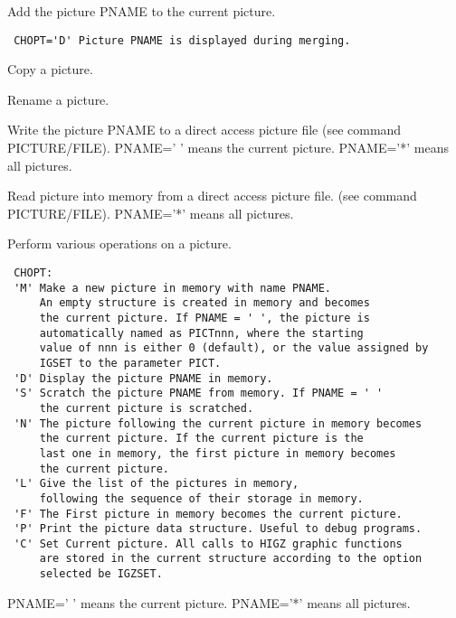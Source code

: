 \BEGARG
{}
\ENDARG
\BEGTEXT
Add the picture PNAME to the current picture.
\begin{verbatim}
 CHOPT='D' Picture PNAME is displayed during merging.
\end{verbatim}
\ENDTEXT

\BEGARG
{}
\ENDARG
\BEGTEXT
Copy a picture.
\ENDTEXT

\BEGARG
{}
\ENDARG
\BEGTEXT
Rename a picture.
\ENDTEXT

\BEGARG
{}
\ENDARG
\BEGTEXT
Write the picture PNAME to a direct access picture file
(see command PICTURE/FILE).
PNAME=' ' means the current picture.
PNAME='*' means all pictures.
\ENDTEXT

\BEGARG
{}
\ENDARG
\BEGTEXT
Read picture into memory from a direct access picture file.
(see command PICTURE/FILE).
PNAME='*' means all pictures.
\ENDTEXT

\BEGARG
{}
\ENDARG
\BEGTEXT
Perform various operations on a picture.
\begin{verbatim}
 CHOPT:
 'M' Make a new picture in memory with name PNAME.
     An empty structure is created in memory and becomes
     the current picture. If PNAME = ' ', the picture is
     automatically named as PICTnnn, where the starting
     value of nnn is either 0 (default), or the value assigned by
     IGSET to the parameter PICT.
 'D' Display the picture PNAME in memory.
 'S' Scratch the picture PNAME from memory. If PNAME = ' '
     the current picture is scratched.
 'N' The picture following the current picture in memory becomes
     the current picture. If the current picture is the
     last one in memory, the first picture in memory becomes
     the current picture.
 'L' Give the list of the pictures in memory,
     following the sequence of their storage in memory.
 'F' The First picture in memory becomes the current picture.
 'P' Print the picture data structure. Useful to debug programs.
 'C' Set Current picture. All calls to HIGZ graphic functions
     are stored in the current structure according to the option
     selected be IGZSET.
\end{verbatim}
PNAME=' ' means the current picture.
PNAME='*' means all pictures.
\ENDTEXT

